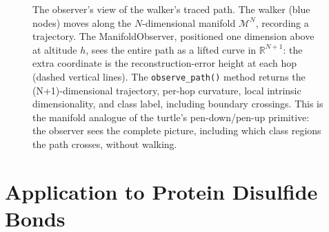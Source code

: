 \documentclass[12pt,letterpaper]{article}
\begin{document}
\begin{figure}[t]
\caption{The observer's view of the walker's traced path.  The walker (blue
nodes) moves along the $N$-dimensional manifold $\mathcal{M}^N$, recording a
trajectory.  The ManifoldObserver, positioned one dimension above at altitude
$h$, sees the entire path as a lifted curve in $\mathbb{R}^{N+1}$: the extra
coordinate is the reconstruction-error height at each hop (dashed vertical
lines).  The \texttt{observe\_path()} method returns the (N+1)-dimensional
trajectory, per-hop curvature, local intrinsic dimensionality, and class label,
including boundary crossings.  This is the manifold analogue of the turtle's
pen-down/pen-up primitive: the observer sees the complete picture, including
which class regions the path crosses, without walking.}
\label{fig:path}
\end{figure}

\section{Application to Protein Disulfide Bonds}
\end{document}
